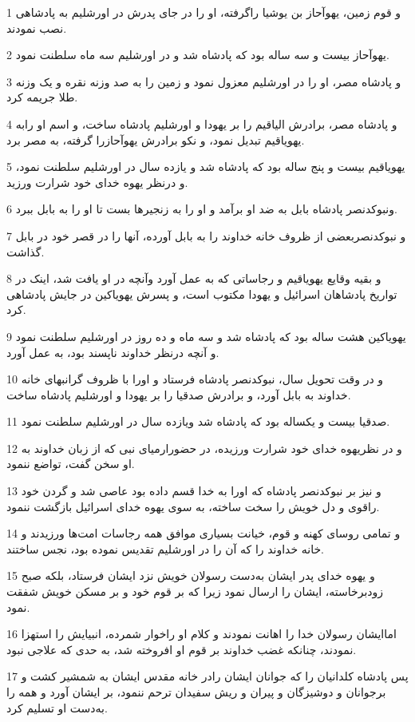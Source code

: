 \par 1 و قوم زمین، یهوآحاز بن یوشیا راگرفته، او را در جای پدرش در اورشلیم به پادشاهی نصب نمودند.
\par 2 یهوآحاز بیست و سه ساله بود که پادشاه شد و در اورشلیم سه ماه سلطنت نمود.
\par 3 و پادشاه مصر، او را در اورشلیم معزول نمود و زمین را به صد وزنه نقره و یک وزنه طلا جریمه کرد.
\par 4 و پادشاه مصر، برادرش الیاقیم را بر یهودا و اورشلیم پادشاه ساخت، و اسم او رابه یهویاقیم تبدیل نمود، و نکو برادرش یهوآحازرا گرفته، به مصر برد.
\par 5 یهویاقیم بیست و پنج ساله بود که پادشاه شد و یازده سال در اورشلیم سلطنت نمود، و درنظر یهوه خدای خود شرارت ورزید.
\par 6 ونبوکدنصر پادشاه بابل به ضد او برآمد و او را به زنجیرها بست تا او را به بابل ببرد.
\par 7 و نبوکدنصربعضی از ظروف خانه خداوند را به بابل آورده، آنها را در قصر خود در بابل گذاشت.
\par 8 و بقیه وقایع یهویاقیم و رجاساتی که به عمل آورد وآنچه در او یافت شد، اینک در تواریخ پادشاهان اسرائیل و یهودا مکتوب است، و پسرش یهویاکین در جایش پادشاهی کرد.
\par 9 یهویاکین هشت ساله بود که پادشاه شد و سه ماه و ده روز در اورشلیم سلطنت نمود و آنچه درنظر خداوند ناپسند بود، به عمل آورد.
\par 10 و در وقت تحویل سال، نبوکدنصر پادشاه فرستاد و اورا با ظروف گرانبهای خانه خداوند به بابل آورد، و برادرش صدقیا را بر یهودا و اورشلیم پادشاه ساخت.
\par 11 صدقیا بیست و یکساله بود که پادشاه شد ویازده سال در اورشلیم سلطنت نمود.
\par 12 و در نظریهوه خدای خود شرارت ورزیده، در حضورارمیای نبی که از زبان خداوند به او سخن گفت، تواضع ننمود.
\par 13 و نیز بر نبوکدنصر پادشاه که اورا به خدا قسم داده بود عاصی شد و گردن خود راقوی و دل خویش را سخت ساخته، به سوی یهوه خدای اسرائیل بازگشت ننمود.
\par 14 و تمامی روسای کهنه و قوم، خیانت بسیاری موافق همه رجاسات امت‌ها ورزیدند و خانه خداوند را که آن را در اورشلیم تقدیس نموده بود، نجس ساختند.
\par 15 و یهوه خدای پدر ایشان به‌دست رسولان خویش نزد ایشان فرستاد، بلکه صبح زودبرخاسته، ایشان را ارسال نمود زیرا که بر قوم خود و بر مسکن خویش شفقت نمود.
\par 16 اماایشان رسولان خدا را اهانت نمودند و کلام او راخوار شمرده، انبیایش را استهزا نمودند، چنانکه غضب خداوند بر قوم او افروخته شد، به حدی که علاجی نبود.
\par 17 پس پادشاه کلدانیان را که جوانان ایشان رادر خانه مقدس ایشان به شمشیر کشت و برجوانان و دوشیزگان و پیران و ریش سفیدان ترحم ننمود، بر ایشان آورد و همه را به‌دست او تسلیم کرد.
